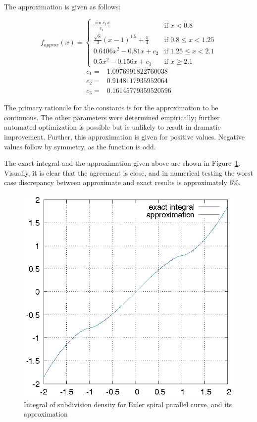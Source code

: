 \documentclass[sigconf, authordraft]{acmart}
\begin{document}
The approximation is given as follows:

\[ 
    f_\mathit{approx}(x) = \left\{
        \begin{array}{rl}
            \frac{\sin c_1 x}{c_1} & \text{if } x < 0.8 \\
            \frac{\sqrt{8}}{3}(x-1)^{1.5} + \frac{\pi}{4} & \text{if } 0.8 \leq x < 1.25 \\
            0.6406x^2 - 0.81x + c_2 & \text{if } 1.25 \leq x < 2.1 \\
            0.5x^2 - 0.156x + c_3 & \text{if } x \geq 2.1
        \end{array}
        \right.
\]
\[
    \begin{array}{ll}
        c_1 = & 1.0976991822760038 \\
        c_2 = & 0.9148117935952064 \\
        c_3 = & 0.16145779359520596
    \end{array}
\]

The primary rationale for the constants is for the approximation to be continuous. The other parameters were determined empirically; further automated optimization is possible but is unlikely to result in dramatic improvement. Further, this approximation is given for positive values. Negative values follow by symmetry, as the function is odd.

The exact integral and the approximation given above are shown in Figure~\ref{fig:espc}. Visually, it is clear that the agreement is close, and in numerical testing the worst case discrepancy between approximate and exact results is approximately 6\%.

\begin{figure}
    \includegraphics{espc}
    \caption{Integral of subdivision density for Euler spiral parallel curve, and its approximation}
    \label{fig:espc}
\end{figure}
\end{document}

